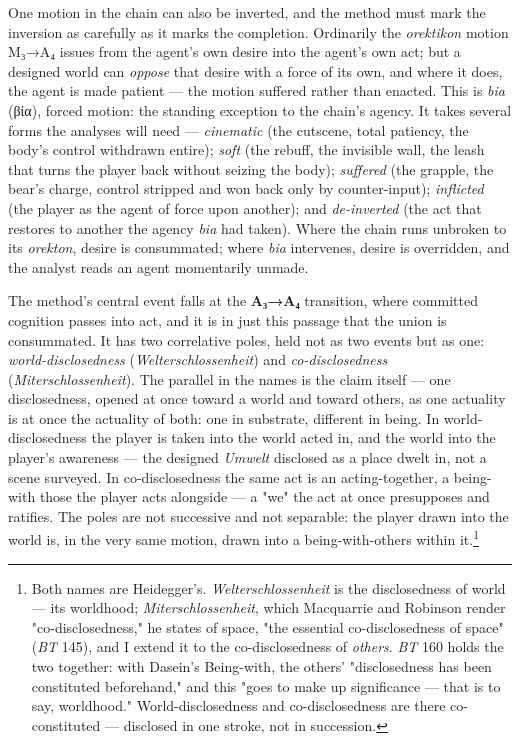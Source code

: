 \documentclass{article}
\newcommand{\gk}[1]{{\greekfont #1}}
\begin{document}
One motion in the chain can also be inverted, and the method must mark the inversion as carefully as it marks the completion. Ordinarily the \textit{orektikon} motion M₃→A₄ issues from the agent's own desire into the agent's own act; but a designed world can \textit{oppose} that desire with a force of its own, and where it does, the agent is made patient — the motion suffered rather than enacted. This is \textit{bia} (\gk{βία}), forced motion: the standing exception to the chain's agency. It takes several forms the analyses will need — \textit{cinematic} (the cutscene, total patiency, the body's control withdrawn entire); \textit{soft} (the rebuff, the invisible wall, the leash that turns the player back without seizing the body); \textit{suffered} (the grapple, the bear's charge, control stripped and won back only by counter-input); \textit{inflicted} (the player as the agent of force upon another); and \textit{de-inverted} (the act that restores to another the agency \textit{bia} had taken). Where the chain runs unbroken to its \textit{orekton}, desire is consummated; where \textit{bia} intervenes, desire is overridden, and the analyst reads an agent momentarily unmade.

The method's central event falls at the \textbf{A₃→A₄} transition, where committed cognition passes into act, and it is in just this passage that the union is consummated. It has two correlative poles, held not as two events but as one: \textit{world-disclosedness} (\textit{Welterschlossenheit}) and \textit{co-disclosedness} (\textit{Miterschlossenheit}). The parallel in the names is the claim itself — one disclosedness, opened at once toward a world and toward others, as one actuality is at once the actuality of both: one in substrate, different in being. In world-disclosedness the player is taken into the world acted in, and the world into the player's awareness — the designed \textit{Umwelt} disclosed as a place dwelt in, not a scene surveyed. In co-disclosedness the same act is an acting-together, a being-with those the player acts alongside — a "we" the act at once presupposes and ratifies. The poles are not successive and not separable: the player drawn into the world is, in the very same motion, drawn into a being-with-others within it.\footnote{Both names are Heidegger's. \textit{Welterschlossenheit} is the disclosedness of world — its worldhood; \textit{Miterschlossenheit}, which Macquarrie and Robinson render "co-disclosedness," he states of space, "the essential co-disclosedness of space" (\textit{BT} 145), and I extend it to the co-disclosedness of \textit{others}. \textit{BT} 160 holds the two together: with Dasein's Being-with, the others' "disclosedness has been constituted beforehand," and this "goes to make up significance — that is to say, worldhood." World-disclosedness and co-disclosedness are there co-constituted — disclosed in one stroke, not in succession.}
\end{document}
